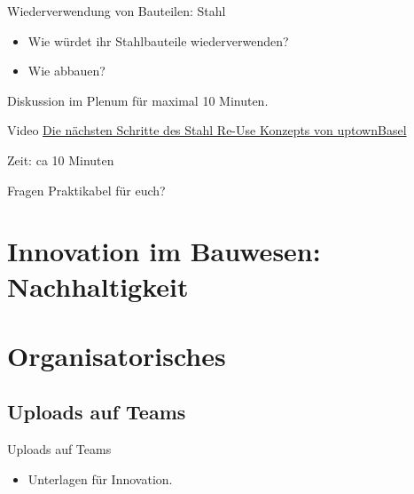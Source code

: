 \begin{frame}{Wiederverwendung von Bauteilen: Stahl}
    \begin{itemize}
        \item Wie würdet ihr Stahlbauteile  wiederverwenden?
        \item Wie abbauen?
    \end{itemize}
    Diskussion im Plenum für maximal 10 Minuten.
\end{frame}


\begin{frame}{Video}
    \href{https://www.youtube.com/watch?v=D3MBcTZ1tI8}{Die nächsten Schritte des Stahl Re-Use Konzepts von uptownBasel
    }

    Zeit: ca 10 Minuten
\end{frame}

\begin{frame}{Fragen}
    Praktikabel für euch?


\end{frame}

\section{Innovation im Bauwesen: Nachhaltigkeit}



\section{Organisatorisches}
\BlueSectionSlide

\subsection{Uploads auf Teams}
\begin{frame}{Uploads auf Teams}
    \begin{itemize}
        \item[\textbullet] Unterlagen für Innovation.
    \end{itemize}

\end{frame}



